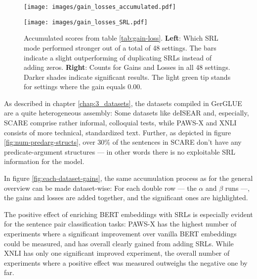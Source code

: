 \begin{figure}
  \begin{minipage}{0.45\linewidth}
  \vspace{0pt}
    \texttt{[image: images/gain\_losses\_accumulated.pdf]}
  \end{minipage}
  \hfill
  \begin{minipage}{0.45\linewidth}
  \vspace{0pt}
    \texttt{[image: images/gain\_losses\_SRL.pdf]}
  \end{minipage}
  \caption[Accumulated Gains and Losses.]{Accumulated scores from table \ref{tab:gain-loss}. \textbf{Left}: Which SRL mode performed stronger out of a total of 48 settings. The bars indicate a slight outperforming of duplicating SRLs instead of adding zeros. \textbf{Right}: Counts for Gains and Losses in all 48 settings. Darker shades indicate significant results. The light green tip stands for settings where the gain equals 0.00.}
  \label{fig:classification-gains}
\end{figure}

As described in chapter \ref{chap:3_datasets}, the datasets compiled in GerGLUE are a quite
heterogeneous assembly: Some datasets like deISEAR and, especially, SCARE comprise rather
informal, colloquial tests, while PAWS-X and XNLI consists of more technical, standardized text.
Further, as depicted in figure \ref{fig:num-predarg-structs}, over 30\% of the sentences
in SCARE don't have any predicate-argument structures --- in other words there is no exploitable SRL
information for the model.

In figure \ref{fig:each-dataset-gains}, the same accumulation process as for the general overview
can be made dataset-wise: For each double row --- the $\alpha$ and $\beta$ runs ---, the gains and
losses are added together, and the significant ones are highlighted.

The positive effect of enriching BERT embeddings with SRLs is especially evident for
the sentence pair classification tasks: PAWS-X has the highest number of experiments where a significant
improvement over vanilla BERT embeddings could be measured, and has overall clearly gained from adding
SRLs. While XNLI has only one significant improved experiment, the overall number of experiments
where a positive effect was measured outweighs the negative one by far.

